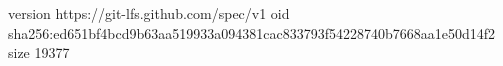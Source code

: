 version https://git-lfs.github.com/spec/v1
oid sha256:ed651bf4bcd9b63aa519933a094381cac833793f54228740b7668aa1e50d14f2
size 19377
